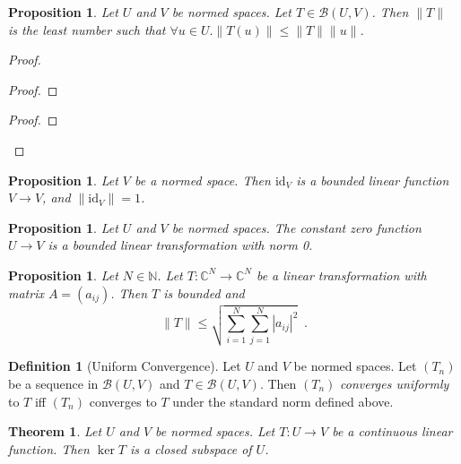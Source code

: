 \documentclass{book}
\let\qed\relax
\newtheorem{prop}[ax]{Proposition}
\newtheorem{thm}[ax]{Theorem}
\theoremstyle{definition}
\newtheorem{df}[ax]{Definition}
\begin{document}
\begin{prop}
\label{prop:normmult}
Let $U$ and $V$ be normed spaces. Let $T \in \mathcal{B}(U,V)$. Then $\|T\|$ is the least number such that $\forall u \in U. \|T(u)\| \leq \|T\| \|u\|$.
\end{prop}

\begin{proof}
\pf
{}
\begin{proof}
\end{proof}
\begin{proof}
\end{proof}
\qed
\end{proof}

\begin{prop}
Let $V$ be a normed space. Then $\mathrm{id}_V$ is a bounded linear function $V \rightarrow V$, and $\| \mathrm{id}_V \| = 1$.
\end{prop}

\begin{prop}
Let $U$ and $V$ be normed spaces. The constant zero function $U \rightarrow V$ is a bounded linear transformation with norm 0.
\end{prop}

\begin{prop}
Let $N \in \mathbb{N}$. Let $T : \mathbb{C}^N \rightarrow \mathbb{C}^N$ be a linear transformation with matrix $A = (a_{ij})$. Then $T$ is bounded and
\[ \| T \| \leq \sqrt{\sum_{i=1}^N \sum_{j=1}^N |a_{ij}|^2} \enspace . \]
\end{prop}

\begin{df}[Uniform Convergence]
Let $U$ and $V$ be normed spaces. Let $(T_n)$ be a sequence in $\mathcal{B}(U,V)$ and $T \in \mathcal{B}(U,V)$. Then $(T_n)$ \emph{converges uniformly} to $T$ iff $(T_n)$ converges to $T$ under the standard norm defined above.
\end{df}

\begin{thm}
Let $U$ and $V$ be normed spaces. Let $T : U \rightarrow V$ be a continuous linear function. Then $\ker T$ is a closed subspace of $U$.
\end{thm}
\end{document}
